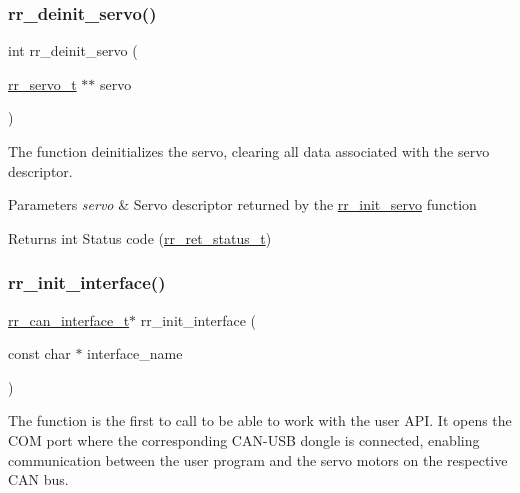 \subsubsection{\texorpdfstring{rr\+\_\+deinit\+\_\+servo()}{rr\_deinit\_servo()}}
{\footnotesize\ttfamily int rr\+\_\+deinit\+\_\+servo (\begin{DoxyParamCaption}\item[{\hyperlink{structrr__servo__t}{rr\+\_\+servo\+\_\+t} $\ast$$\ast$}]{servo }\end{DoxyParamCaption})}



The function deinitializes the servo, clearing all data associated with the servo descriptor. 


\begin{DoxyParams}{Parameters}
{\em servo} & Servo descriptor returned by the \hyperlink{group___init_ga0adb313a3eeb8a4399431e940a1f3e9e}{rr\+\_\+init\+\_\+servo} function \\
\hline
\end{DoxyParams}
\begin{DoxyReturn}{Returns}
int Status code (\hyperlink{api_8h_a92d5be5038abcf89837faf85a08debdc}{rr\+\_\+ret\+\_\+status\+\_\+t}) 
\end{DoxyReturn}
\mbox{\label{group___init_ga472a4890dcc7d7a13123c56a06946d91}} 
\subsubsection{\texorpdfstring{rr\+\_\+init\+\_\+interface()}{rr\_init\_interface()}}
{\footnotesize\ttfamily \hyperlink{structrr__can__interface__t}{rr\+\_\+can\+\_\+interface\+\_\+t}$\ast$ rr\+\_\+init\+\_\+interface (\begin{DoxyParamCaption}\item[{const char $\ast$}]{interface\+\_\+name }\end{DoxyParamCaption})}



The function is the first to call to be able to work with the user A\+PI. It opens the C\+OM port where the corresponding C\+A\+N-\/\+U\+SB dongle is connected, enabling communication between the user program and the servo motors on the respective C\+AN bus. 

